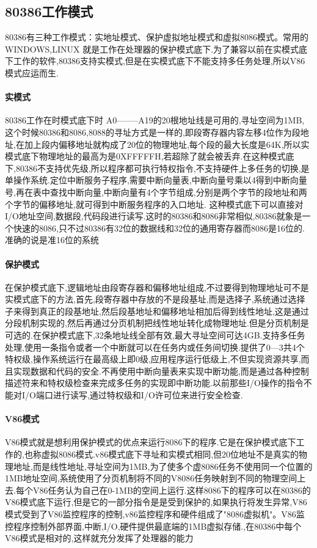 \documentclass[12pt]{article}
\begin{document}
\subsection{80386工作模式}
80386有三种工作模式：实地址模式、保护虚拟地址模式和虚拟8086模式。常用的WINDOWS,LINUX 就是工作在处理器的保护模式底下.为了兼容以前在实模式底下工作的软件,80386支持实模式,但是在实模式底下不能支持多任务处理,所以V86模式应运而生.
\paragraph{实模式} 
80386工作在时模式底下时 A0--------A19的20根地址线是可用的,寻址空间为1MB,这个时候80386和8086,8088的寻址方式是一样的,即段寄存器内容左移4位作为段地址,在加上段内偏移地址就构成了20位的物理地址,每个段的最大长度是64K,所以实模式底下物理地址的最高为是0XFFFFFH,若超除了就会被丢弃.在这种模式底下,80386不支持优先级,所以程序都可执行特权指令,不支持硬件上多任务的切换,是单操作系统.定位中断服务子程序,需要中断向量表,中断向量号乘以4得到中断向量号,再在表中查找中断向量,中断向量有4个字节组成,分别是两个字节的段地址和两个字节的偏移地址,就可得到中断服务程序的入口地址. 这种模式底下可以直接对I/O地址空间,数据段,代码段进行读写.这时的80386和8086非常相似,80386就象是一个快速的8086,只不过80386有32位的数据线和32位的通用寄存器而8086是16位的.准确的说是准16位的系统
\paragraph{保护模式} 
在保护模式底下,逻辑地址由段寄存器和偏移地址组成,不过要得到物理地址可不是实模式底下的方法,首先,段寄存器中存放的不是段基址,而是选择子,系统通过选择子来得到真正的段基地址,然后段基地址和偏移地址相加后得到线性地址,这是通过分段机制实现的,然后再通过分页机制把线性地址转化成物理地址.但是分页机制是可选的.在保护模式底下,32条地址线全部有效,最大寻址空间可达4GB.支持多任务处理,使用一条指令或者一个中断就可以在任务内或任务间切换.提供了0---3共4个特权级,操作系统运行在最高级上即0级,应用程序运行低级上,不但实现资源共享,而且实现数据和代码的安全.不再使用中断向量表来实现中断功能,而是通过各种控制描述符来和特权级检查来完成多任务的实现即中断功能.以前那些I/O操作的指令不能对I/O端口进行读写,通过特权级和I/O许可位来进行安全检查.
\paragraph{V86模式} 
V86模式就是想利用保护模式的优点来运行8086下的程序.它是在保护模式底下工作的,也称虚拟8086模式.v86模式底下寻址和实模式相同,但20位地址不是真实的物理地址,而是线性地址,寻址空间为1MB,为了使多个虚8086任务不使用同一个位置的1MB地址空间,系统使用了分页机制将不同的V8086任务映射到不同的物理空间上去.每个V86任务认为自己在0-1MB的空间上运行.这样8086下的程序可以在80386的V86模式底下运行,但是它的一部分指令是是受到保护的,如果执行将发生异常,V86模式受到了V86监控程序的控制,v86监控程序和硬件组成了"8086虚拟机"。V86监控程序控制外部界面,中断,I/O,硬件提供最底端的1MB虚拟存储.,在80386中每个V86模式是相对的,这样就充分发挥了处理器的能力
\end{document}
